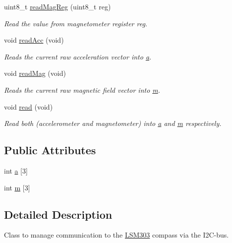 \begin{DoxyCompactItemize}
uint8\-\_\-t \hyperlink{class_l_s_m303_a5d6d0b492501b76b7fde821036205bda}{read\-Mag\-Reg} (uint8\-\_\-t reg)
\begin{DoxyCompactList}\small\item\em \-Read the value from magnetometer register reg. \end{DoxyCompactList}\item 
void \hyperlink{class_l_s_m303_ac1396a51b288eadc41fd19fbd79ef68e}{read\-Acc} (void)
\begin{DoxyCompactList}\small\item\em \-Reads the current raw acceleration vector into \hyperlink{class_l_s_m303_ad71c39fa2c1dfd978c9e93b48a6a9310}{a}. \end{DoxyCompactList}\item 
void \hyperlink{class_l_s_m303_abc93e8d8101c6b00df2ae85c5f8ded9e}{read\-Mag} (void)
\begin{DoxyCompactList}\small\item\em \-Reads the current raw magnetic field vector into \hyperlink{class_l_s_m303_a606cb6a86d385c4c4a9767f6b1bf2ea5}{m}. \end{DoxyCompactList}\item 
void \hyperlink{class_l_s_m303_a9f40456878f534bba32490d19f3a64ce}{read} (void)
\begin{DoxyCompactList}\small\item\em \-Read both (accelerometer and magnetometer) into \hyperlink{class_l_s_m303_ad71c39fa2c1dfd978c9e93b48a6a9310}{a} and \hyperlink{class_l_s_m303_a606cb6a86d385c4c4a9767f6b1bf2ea5}{m} respectively. \end{DoxyCompactList}\end{DoxyCompactItemize}
\subsection*{\-Public \-Attributes}
\begin{DoxyCompactItemize}
\item 
int \hyperlink{class_l_s_m303_ad71c39fa2c1dfd978c9e93b48a6a9310}{a} \mbox{[}3\mbox{]}
\item 
int \hyperlink{class_l_s_m303_a606cb6a86d385c4c4a9767f6b1bf2ea5}{m} \mbox{[}3\mbox{]}
\end{DoxyCompactItemize}


\subsection{\-Detailed \-Description}
\-Class to manage communication to the \hyperlink{class_l_s_m303}{\-L\-S\-M303} compass via the \-I2\-C-\/bus. 

